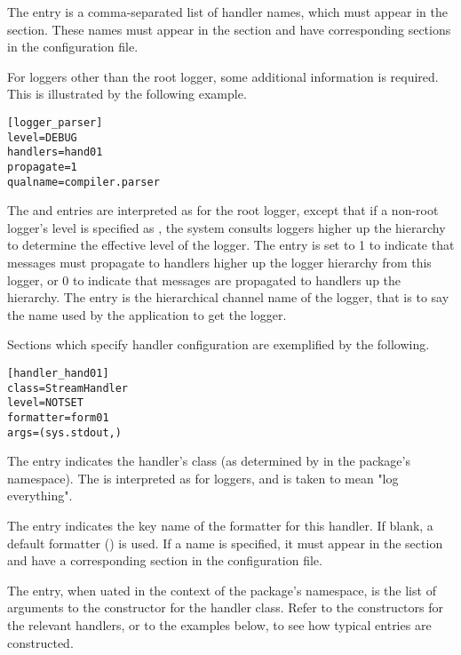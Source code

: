 The  entry is a comma-separated list of handler names,
which must appear in the \code{[handlers]} section. These names must
appear in the \code{[handlers]} section and have corresponding
sections in the configuration file.

For loggers other than the root logger, some additional information is
required. This is illustrated by the following example.

\begin{verbatim}
[logger_parser]
level=DEBUG
handlers=hand01
propagate=1
qualname=compiler.parser
\end{verbatim}

The  and  entries are interpreted as for
the root logger, except that if a non-root logger's level is specified
as , the system consults loggers higher up the hierarchy
to determine the effective level of the logger. The 
entry is set to 1 to indicate that messages must propagate to handlers
higher up the logger hierarchy from this logger, or 0 to indicate that
messages are  propagated to handlers up the hierarchy. The
 entry is the hierarchical channel name of the logger,
that is to say the name used by the application to get the logger.

Sections which specify handler configuration are exemplified by the
following.

\begin{verbatim}
[handler_hand01]
class=StreamHandler
level=NOTSET
formatter=form01
args=(sys.stdout,)
\end{verbatim}

The  entry indicates the handler's class (as determined by
 in the  package's namespace). The
 is interpreted as for loggers, and  is taken
to mean "log everything".

The  entry indicates the key name of the formatter for
this handler. If blank, a default formatter
() is used. If a name is specified, it
must appear in the \code{[formatters]} section and have a
corresponding section in the configuration file.

The  entry, when uated in the context of
the  package's namespace, is the list of arguments to
the constructor for the handler class. Refer to the constructors for
the relevant handlers, or to the examples below, to see how typical
entries are constructed.

